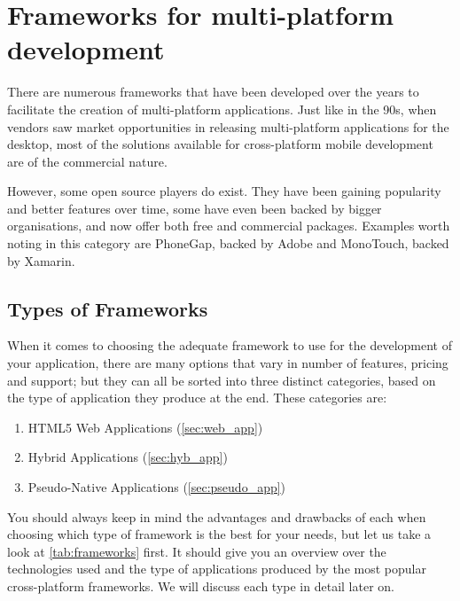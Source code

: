 \chapter{Frameworks for multi-platform development}\label{ch:frameworks}
There are numerous frameworks that have been developed over the years to facilitate the creation of multi-platform applications. Just like in the 90s, when vendors saw market opportunities in releasing multi-platform applications for the desktop, most of the solutions available for cross-platform mobile development are of the commercial nature.


However,  some open source players do exist. They have been gaining popularity and better features over time, some have even been backed by bigger organisations, and now offer both free and commercial packages. Examples worth noting in this category are PhoneGap, backed by Adobe and MonoTouch, backed by Xamarin.

\section{Types of Frameworks}
When it comes to choosing the adequate framework to use for the development of your application, there are many options that vary in number of features, pricing and support; but they can all be sorted into three distinct categories, based on the type of application they produce at the end. These categories are:
\begin{enumerate}
    \item HTML5 Web Applications (\autoref{sec:web_app})
    \item Hybrid Applications (\autoref{sec:hyb_app})
    \item Pseudo-Native Applications (\autoref{sec:pseudo_app})
\end{enumerate}

You should always keep in mind the advantages and drawbacks of each when choosing which type of framework is the best for your needs, but let us take a look at \autoref{tab:frameworks} first. It should give you an overview over the technologies used and the type of applications produced by the most popular cross-platform frameworks. We will discuss each type in detail later on.\newline

